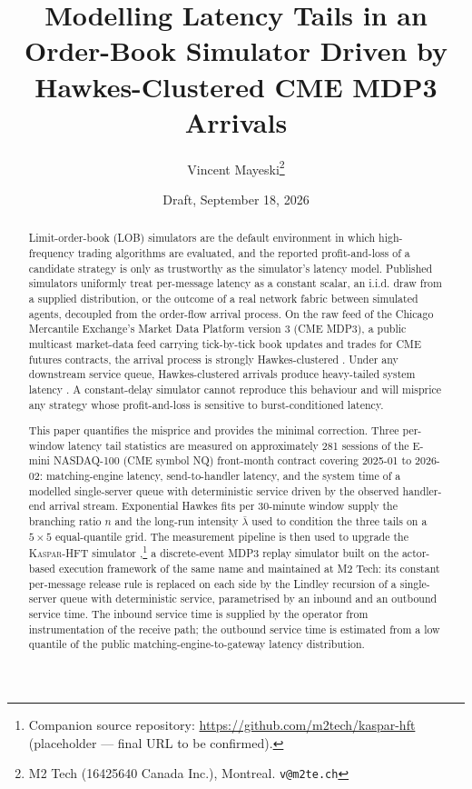 \documentclass[11pt]{article}
\title{Modelling Latency Tails in an Order-Book Simulator Driven by Hawkes-Clustered CME MDP3 Arrivals}
\author{Vincent Mayeski\thanks{M2 Tech (16425640 Canada Inc.), Montreal. \texttt{v@m2te.ch}}}
\date{Draft, September 18, 2026}
\newcommand{\kasparhft}{\textsc{Kaspar-HFT}}
\begin{document}
\maketitle

\begin{abstract}
Limit-order-book (LOB) simulators are the default environment in which high-frequency trading algorithms are evaluated, and the reported profit-and-loss of a candidate strategy is only as trustworthy as the simulator's latency model. Published simulators uniformly treat per-message latency as a constant scalar, an i.i.d. draw from a supplied distribution, or the outcome of a real network fabric between simulated agents, decoupled from the order-flow arrival process. On the raw feed of the Chicago Mercantile Exchange's Market Data Platform version 3 (CME MDP3), a public multicast market-data feed carrying tick-by-tick book updates and trades for CME futures contracts, the arrival process is strongly Hawkes-clustered \citep{hawkes1971spectra,bacry2015review}. Under any downstream service queue, Hawkes-clustered arrivals produce heavy-tailed system latency \citep{dawpender2018queues}. A constant-delay simulator cannot reproduce this behaviour and will misprice any strategy whose profit-and-loss is sensitive to burst-conditioned latency.

This paper quantifies the misprice and provides the minimal correction. Three per-window latency tail statistics are measured on approximately 281 sessions of the E-mini NASDAQ-100 (CME symbol NQ) front-month contract covering 2025-01 to 2026-02: matching-engine latency, send-to-handler latency, and the system time of a modelled single-server queue with deterministic service driven by the observed handler-end arrival stream. Exponential Hawkes fits per 30-minute window supply the branching ratio $n$ and the long-run intensity $\bar\lambda$ used to condition the three tails on a $5 \times 5$ equal-quantile grid. The measurement pipeline is then used to upgrade the \kasparhft{} simulator \citep{mayeski_actorhft},\footnote{Companion source repository: \url{https://github.com/m2tech/kaspar-hft} (placeholder --- final URL to be confirmed).} a discrete-event MDP3 replay simulator built on the actor-based execution framework of the same name and maintained at M2 Tech: its constant per-message release rule is replaced on each side by the Lindley recursion of a single-server queue with deterministic service, parametrised by an inbound and an outbound service time. The inbound service time is supplied by the operator from instrumentation of the receive path; the outbound service time is estimated from a low quantile of the public matching-engine-to-gateway latency distribution.


\end{abstract}
\end{document}
